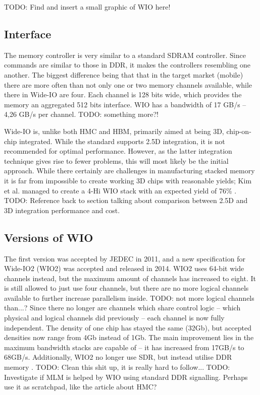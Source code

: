 TODO: Find and insert a small graphic of WIO here!

\subsection{Interface}
The memory controller is very similar to a standard SDRAM controller. Since commands are similar to those in DDR, it makes the controllers resembling one another. The biggest difference being that that in the target market (mobile) there are more often than not only one or two memory channels available, while there in Wide-IO are four. Each channel is 128 bits wide, which provides the memory an aggregated 512 bits interface. WIO has a bandwidth of 17 GB/s -- 4,26 GB/s per channel. TODO: something more?!
\bigskip

Wide-IO is, unlike both HMC and HBM, primarily aimed at being 3D, chip-on-chip integrated. While the standard supports 2.5D integration, it is not recommended for optimal performance. However, as the latter integration technique gives rise to fewer problems, this will most likely be the initial approach. While there certainly are challenges in manufacturing stacked memory it is far from impossible to create working 3D chips with reasonable yields; Kim et al. managed to create a 4-Hi WIO stack with an expected yield of 76\% \cite{kim20121}. TODO: Reference back to section talking about comparison between 2.5D and 3D integration performance and cost.

\subsection{Versions of WIO}
The first version was accepted by JEDEC in 2011, and a new specification for Wide-IO2 (WIO2) was accepted and released in 2014. WIO2 uses 64-bit wide channels instead, but the maximum amount of channels has increased to eight. It is still allowed to just use four channels, but there are no more logical channels available to further increase parallelism inside. TODO: not more logical channels than...? Since there no longer are channels which share control logic -- which physical and logical channels did previously -- each channel is now fully independent. The density of one chip has stayed the same (32Gb), but accepted densities now range from 4Gb instead of 1Gb. The main improvement lies in the maximum bandwidth stacks are capable of -- it has increased from 17GB/s to 68GB/s. Additionally, WIO2 no longer use SDR, but instead utilise DDR memory \cite{standard2014wide}. TODO: Clean this shit up, it is really hard to follow...
TODO: Investigate if MLM is helped by WIO using standard DDR signalling. Perhaps use it as scratchpad, like the article about HMC? 

